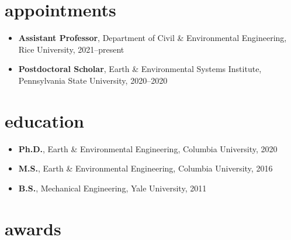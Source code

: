 \documentclass[11pt,article,oneside]{memoir}
\begin{document}

\section{appointments}

\mbox{}\vspace{-\dimexpr\baselineskip\relax}

\begin{itemize}[label={}]

  \item \textbf{Assistant Professor}, Department of Civil \& Environmental Engineering, Rice University, 2021--present

  \item \textbf{Postdoctoral Scholar}, Earth \& Environmental Systems Institute, Pennsylvania State University, 2020--2020

\end{itemize}


\section{education}

\mbox{}\vspace{-\dimexpr\baselineskip\relax}

\begin{itemize}[label={}]

  \item \textbf{Ph.D.}, Earth \& Environmental Engineering, Columbia University, 2020

  \item \textbf{M.S.}, Earth \& Environmental Engineering, Columbia University, 2016

  \item \textbf{B.S.}, Mechanical Engineering, Yale University, 2011

\end{itemize}


\section{awards}

\mbox{}\vspace{-\dimexpr\baselineskip\relax}
\end{document}
